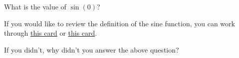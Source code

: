 \documentclass{ximera}
\begin{document}
\begin{problem} 

\begin{problem}
    What is the value of $\sin(0)$?
    
    \begin{hint}
    If you would like to review the definition of the sine function, you can work through \href{https://ximera.osu.edu/math160fa17/m160prerequisites/prerequisiteVideos/trigUnitCircle}{this card} or \href{https://ximera.osu.edu/math160fa17/m160prerequisites/reviewOfFamousFunctions/digInTrigonometricFunctions}{this card}.
    \end{hint}

  \begin{multipleChoice}
      \choice{$\pi$}
      \choice{$2\pi$}
      
      
  \end{multipleChoice}
  
\end{problem}

\begin{question}
  
  If you didn't, why didn't you answer the above question?
  
  \begin{multipleChoice}
      
  \end{multipleChoice}
  
\end{question}

\end{problem}
\end{document}
